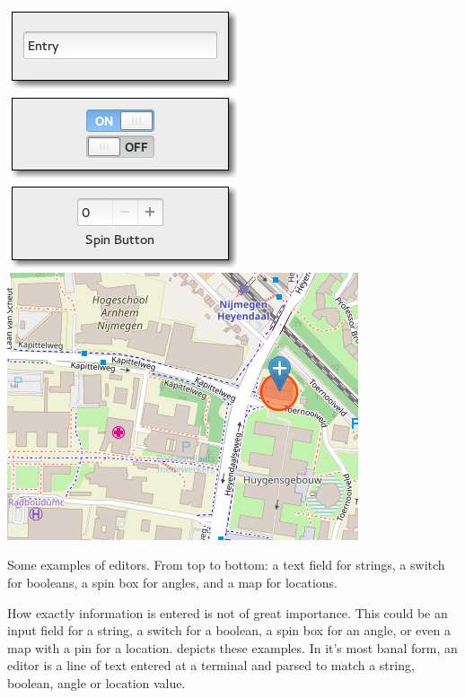 \begin{marginfigure}
  \centering
  \includegraphics[width=0.7\marginwidth]{figures/text-entry}
  \includegraphics[width=0.7\marginwidth]{figures/switch-button}
  \includegraphics[width=0.7\marginwidth]{figures/spin-button}
  \includegraphics[width=0.7\marginwidth]{figures/map}
  \caption{
    Some examples of editors.
    From top to bottom:
    a text field for strings,
    a switch for booleans,
    a spin box for angles,
    and a map for locations.
  }
  \label{fig:editor-examples}
\end{marginfigure}

How exactly information is entered is not of great importance.
This could be an input field for a string,
a switch for a boolean,
a spin box for an angle,
or even a map with a pin for a location.
 depicts these examples.
In it's most banal form,
an editor is a line of text entered at a terminal and parsed to match a string, boolean, angle or location value.

